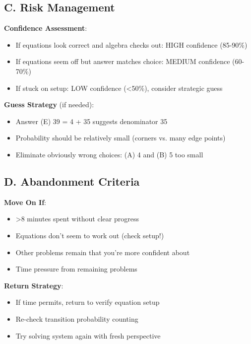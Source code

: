 \documentclass[12pt]{article}
\begin{document}
\begin{competitionbox}
\subsection*{C. Risk Management}

\textbf{Confidence Assessment}:
\begin{itemize}[leftmargin=*]
    \item If equations look correct and algebra checks out: HIGH confidence (85-90\%)
    \item If equations seem off but answer matches choice: MEDIUM confidence (60-70\%)
    \item If stuck on setup: LOW confidence (<50\%), consider strategic guess
\end{itemize}

\textbf{Guess Strategy} (if needed):
\begin{itemize}[leftmargin=*]
    \item Answer (E) 39 = 4 + 35 suggests denominator 35
    \item Probability should be relatively small (corners vs. many edge points)
    \item Eliminate obviously wrong choices: (A) 4 and (B) 5 too small
\end{itemize}

\subsection*{D. Abandonment Criteria}

\textbf{Move On If}:
\begin{itemize}[leftmargin=*]
    \item >8 minutes spent without clear progress
    \item Equations don't seem to work out (check setup!)
    \item Other problems remain that you're more confident about
    \item Time pressure from remaining problems
\end{itemize}

\textbf{Return Strategy}:
\begin{itemize}[leftmargin=*]
    \item If time permits, return to verify equation setup
    \item Re-check transition probability counting
    \item Try solving system again with fresh perspective
\end{itemize}


\end{competitionbox}
\end{document}
